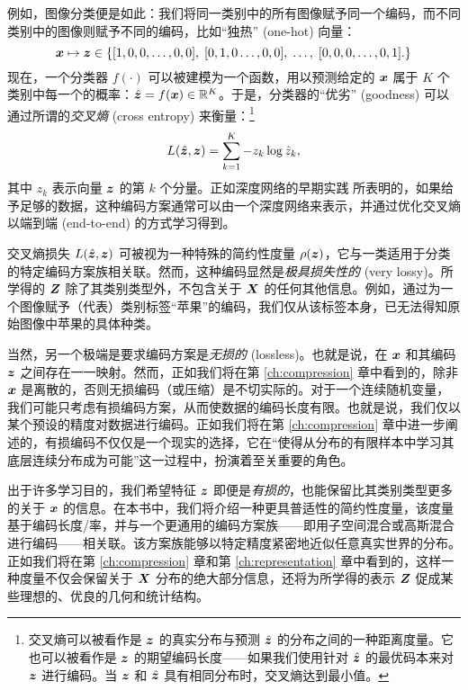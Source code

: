 \documentclass[../../book-main_zh.tex]{subfiles}
\begin{document}
\begin{example}
例如，图像分类便是如此：我们将同一类别中的所有图像赋予同一个编码，而不同类别中的图像则赋予不同的编码，比如“独热” (one-hot) 向量：
\begin{equation}
  \bm{x} \mapsto \bm{z} \in \{  [1, 0, 0, \ldots , 0, 0], \;  [0, 1, 0 \ldots, 0, 0], \; \ldots, \;  [0,0,0, \ldots, 0, 1].\}
  \label{eqn:class-labels}
\end{equation}
现在，一个分类器 $f(\cdot)$ 可以被建模为一个函数，用以预测给定的 $\bm{x}$ 属于 $K$ 个类别中每一个的概率：$\hat{\bm{z}} = f(\bm{x}) \in \mathbb{R}^K$。于是，分类器的“优劣” (goodness) 可以通过所谓的{\em 交叉熵} (cross entropy) 来衡量：\footnote{交叉熵可以被看作是 $\bm{z}$ 的真实分布与预测 $\hat{\bm{z}}$ 的分布之间的一种距离度量。它也可以被看作是 $\bm{z}$ 的期望编码长度——如果我们使用针对 $\hat{\bm{z}}$ 的最优码本来对 $\bm{z}$ 进行编码。当 $\bm{z}$ 和 $\hat{\bm{z}}$ 具有相同分布时，交叉熵达到最小值。}
\begin{equation}
    L(\hat{\bm{z}}, \bm{z}) = \sum_{k=1}^K - z_k \log \hat{z}_k,
\end{equation}
其中 $z_k$ 表示向量 $\bm{z}$ 的第 $k$ 个分量。正如深度网络的早期实践 \cite{krizhevsky2012imagenet} 所表明的，如果给予足够的数据，这种编码方案通常可以由一个深度网络来表示，并通过优化交叉熵以端到端 (end-to-end) 的方式学习得到。
\end{example}

交叉熵损失 $L(\hat {\bm{z}}, \bm{z})$ 可被视为一种特殊的简约性度量 $\rho(\bm{z})$，它与一类适用于分类的特定编码方案族相关联。然而，这种编码显然是{\em 极具损失性的} (very lossy)。所学得的 $\bm{Z}$ 除了其类别类型外，不包含关于 $\bm{X}$ 的任何其他信息。例如，通过为一个图像赋予（代表）类别标签“苹果”的编码，我们仅从该标签本身，已无法得知原始图像中苹果的具体种类。

当然，另一个极端是要求编码方案是{\em 无损的} (lossless)。也就是说，在 $\bm{x}$ 和其编码 $\bm{z}$ 之间存在一一映射。然而，正如我们将在第 \ref{ch:compression} 章中看到的，除非 $\bm{x}$ 是离散的，否则无损编码（或压缩）是不切实际的。对于一个连续随机变量，我们可能只考虑有损编码方案，从而使数据的编码长度有限。也就是说，我们仅以某个预设的精度对数据进行编码。正如我们将在第 \ref{ch:compression} 章中进一步阐述的，有损编码不仅仅是一个现实的选择，它在“使得从分布的有限样本中学习其底层连续分布成为可能”这一过程中，扮演着至关重要的角色。

出于许多学习目的，我们希望特征 $\bm{z}$ 即便是{\em 有损的}，也能保留比其类别类型更多的关于 $\bm{x}$ 的信息。在本书中，我们将介绍一种更具普适性的简约性度量，该度量基于编码长度/率，并与一个更通用的编码方案族——即用子空间混合或高斯混合进行编码——相关联。该方案族能够以特定精度紧密地近似任意真实世界的分布。正如我们将在第 \ref{ch:compression} 章和第 \ref{ch:representation} 章中看到的，这样一种度量不仅会保留关于 $\bm{X}$ 分布的绝大部分信息，还将为所学得的表示 $\bm{Z}$ 促成某些理想的、优良的几何和统计结构。
\end{document}
